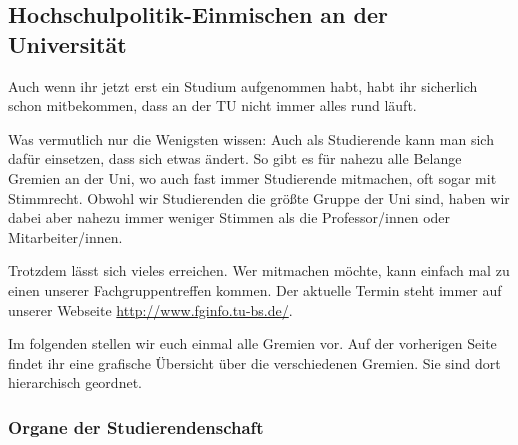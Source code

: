 \subsection{Hochschulpolitik-Einmischen an der Universität}

Auch wenn ihr jetzt erst ein Studium aufgenommen habt, habt ihr sicherlich 
schon mitbekommen, dass an der TU nicht immer alles rund läuft.

Was vermutlich nur die Wenigsten wissen: Auch als Studierende kann man sich 
dafür einsetzen, dass sich etwas ändert. So gibt es für nahezu alle Belange Gremien 
an der Uni, wo auch fast immer Studierende mitmachen, oft sogar mit Stimmrecht. 
Obwohl wir Studierenden die größte Gruppe der Uni sind, haben wir dabei aber nahezu immer 
weniger Stimmen als die Professor/innen oder Mitarbeiter/innen. 

Trotzdem lässt sich vieles erreichen. Wer mitmachen möchte, kann einfach 
mal zu einen unserer Fachgruppentreffen kommen. Der aktuelle Termin steht immer 
auf unserer Webseite \url{http://www.fginfo.tu-bs.de/}.

Im folgenden stellen wir euch einmal alle Gremien vor.
Auf der vorherigen Seite findet ihr eine grafische Übersicht über die verschiedenen Gremien. Sie sind dort hierarchisch geordnet.

\subsubsection*{Organe der Studierendenschaft}

